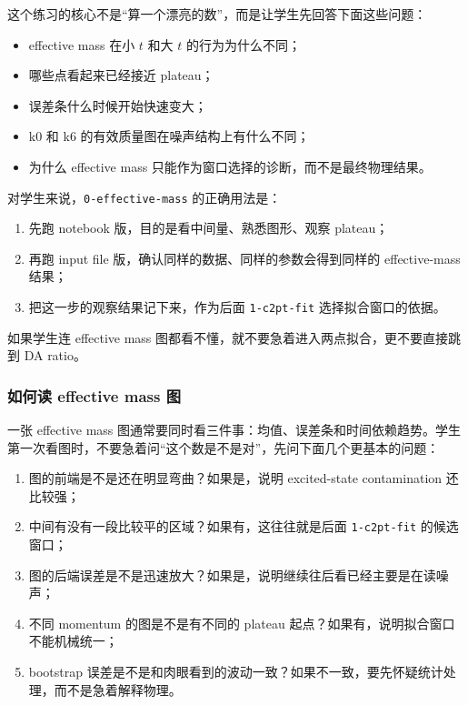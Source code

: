\documentclass[11pt,a4paper,fontset=fandol]{ctexart}
\begin{document}
这个练习的核心不是“算一个漂亮的数”，而是让学生先回答下面这些问题：

\begin{itemize}[leftmargin=2em]
  \item effective mass 在小 $t$ 和大 $t$ 的行为为什么不同；
  \item 哪些点看起来已经接近 plateau；
  \item 误差条什么时候开始快速变大；
  \item k0 和 k6 的有效质量图在噪声结构上有什么不同；
  \item 为什么 effective mass 只能作为窗口选择的诊断，而不是最终物理结果。
\end{itemize}

对学生来说，\lstinline|0-effective-mass| 的正确用法是：

\begin{enumerate}[leftmargin=2em]
  \item 先跑 notebook 版，目的是看中间量、熟悉图形、观察 plateau；
  \item 再跑 input file 版，确认同样的数据、同样的参数会得到同样的 effective-mass 结果；
  \item 把这一步的观察结果记下来，作为后面 \lstinline|1-c2pt-fit| 选择拟合窗口的依据。
\end{enumerate}

如果学生连 effective mass 图都看不懂，就不要急着进入两点拟合，更不要直接跳到 DA ratio。

\subsubsection{如何读 effective mass 图}

一张 effective mass 图通常要同时看三件事：均值、误差条和时间依赖趋势。学生第一次看图时，不要急着问“这个数是不是对”，先问下面几个更基本的问题：

\begin{enumerate}[leftmargin=2em]
  \item 图的前端是不是还在明显弯曲？如果是，说明 excited-state contamination 还比较强；
  \item 中间有没有一段比较平的区域？如果有，这往往就是后面 \lstinline|1-c2pt-fit| 的候选窗口；
  \item 图的后端误差是不是迅速放大？如果是，说明继续往后看已经主要是在读噪声；
  \item 不同 momentum 的图是不是有不同的 plateau 起点？如果有，说明拟合窗口不能机械统一；
  \item bootstrap 误差是不是和肉眼看到的波动一致？如果不一致，要先怀疑统计处理，而不是急着解释物理。
\end{enumerate}
\end{document}
